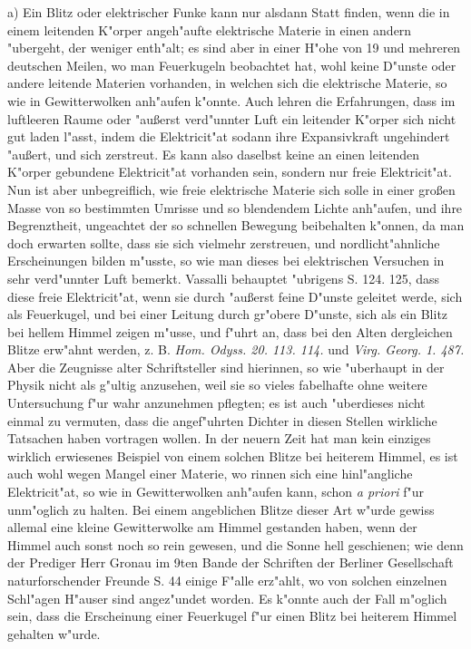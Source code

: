 \documentclass[a4paper, 11pt, oneside, polutonikogreek, german]{article}
\begin{document}
a) Ein Blitz oder elektrischer Funke kann nur alsdann Statt finden, wenn die in einem leitenden K"orper angeh"aufte elektrische Materie in einen andern "ubergeht, der weniger enth"alt; es sind aber in einer H"ohe von 19 und mehreren deutschen Meilen, wo man Feuerkugeln beobachtet hat, wohl keine D"unste oder andere leitende Materien vorhanden, in welchen sich die elektrische Materie, so wie in Gewitterwolken anh"aufen k"onnte. Auch lehren die Erfahrungen, dass im luftleeren Raume oder "außerst verd"unnter Luft ein leitender K"orper sich nicht gut laden l"asst, indem die Elektricit"at sodann ihre Expansivkraft ungehindert "außert, und sich zerstreut. Es kann also daselbst keine an einen leitenden K"orper gebundene Elektricit"at vorhanden sein, sondern nur freie Elektricit"at. Nun ist aber unbegreiflich, wie freie elektrische Materie sich solle in einer großen Masse von so bestimmten Umrisse und so blendendem Lichte anh"aufen, und ihre Begrenztheit, ungeachtet der so schnellen Bewegung beibehalten k"onnen, da man doch erwarten sollte, dass sie sich vielmehr zerstreuen, und nordlicht"ahnliche Erscheinungen bilden m"usste, so wie man dieses bei elektrischen Versuchen in sehr verd"unnter Luft bemerkt. Vassalli behauptet "ubrigens S. 124. 125, dass diese freie Elektricit"at, wenn sie durch "außerst feine D"unste geleitet werde, sich als Feuerkugel, und bei einer Leitung durch gr"obere D"unste, sich als ein Blitz bei hellem Himmel zeigen m"usse, und f"uhrt an, dass bei den Alten dergleichen Blitze erw"ahnt werden, z. B. \emph{Hom. Odyss. 20. 113. 114.} und \emph{Virg. Georg. 1. 487.} Aber die Zeugnisse alter Schriftsteller sind hierinnen, so wie "uberhaupt in der Physik nicht als g"ultig anzusehen, weil sie so vieles fabelhafte ohne weitere Untersuchung f"ur wahr anzunehmen pflegten; es ist auch "uberdieses nicht einmal zu vermuten, dass die angef"uhrten Dichter in diesen Stellen wirkliche Tatsachen haben vortragen wollen. In der neuern Zeit hat man kein einziges wirklich erwiesenes Beispiel von einem solchen Blitze bei heiterem Himmel, es ist auch wohl wegen Mangel einer Materie, wo rinnen sich eine hinl"angliche Elektricit"at, so wie in Gewitterwolken anh"aufen kann, schon \emph{a priori} f"ur unm"oglich zu halten. Bei einem angeblichen Blitze dieser Art w"urde gewiss allemal eine kleine Gewitterwolke am Himmel gestanden haben, wenn der Himmel auch sonst noch so rein gewesen, und die Sonne hell geschienen; wie denn der Prediger Herr Gronau im 9ten Bande der Schriften der Berliner Gesellschaft naturforschender Freunde S. 44 einige F"alle erz"ahlt, wo von solchen einzelnen Schl"agen H"auser sind angez"undet worden. Es k"onnte auch der Fall m"oglich sein, dass die Erscheinung einer Feuerkugel f"ur einen Blitz bei heiterem Himmel gehalten w"urde.
\end{document}
